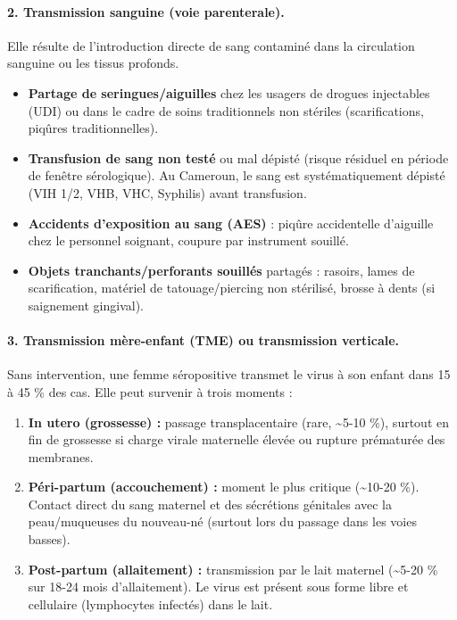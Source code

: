 \documentclass[11pt]{article}
\begin{document}
\paragraph{2. Transmission sanguine (voie parenterale).}
Elle résulte de l'introduction directe de sang contaminé dans la circulation sanguine ou les tissus profonds.
\begin{itemize}
    \item \textbf{Partage de seringues/aiguilles} chez les usagers de drogues injectables (UDI) ou dans le cadre de soins traditionnels non stériles (scarifications, piqûres traditionnelles).
    \item \textbf{Transfusion de sang non testé} ou mal dépisté (risque résiduel en période de fenêtre sérologique). Au Cameroun, le sang est systématiquement dépisté (VIH 1/2, VHB, VHC, Syphilis) avant transfusion.
    \item \textbf{Accidents d'exposition au sang (AES)} : piqûre accidentelle d'aiguille chez le personnel soignant, coupure par instrument souillé.
    \item \textbf{Objets tranchants/perforants souillés} partagés : rasoirs, lames de scarification, matériel de tatouage/piercing non stérilisé, brosse à dents (si saignement gingival).
\end{itemize}

\paragraph{3. Transmission mère-enfant (TME) ou transmission verticale.}
Sans intervention, une femme séropositive transmet le virus à son enfant dans 15 à 45 \% des cas. Elle peut survenir à trois moments :
\begin{enumerate}
    \item \textbf{In utero (grossesse) :} passage transplacentaire (rare, \textasciitilde 5-10 \%), surtout en fin de grossesse si charge virale maternelle élevée ou rupture prématurée des membranes.
    \item \textbf{Péri-partum (accouchement) :} moment le plus critique (\textasciitilde 10-20 \%). Contact direct du sang maternel et des sécrétions génitales avec la peau/muqueuses du nouveau-né (surtout lors du passage dans les voies basses).
    \item \textbf{Post-partum (allaitement) :} transmission par le lait maternel (\textasciitilde 5-20 \% sur 18-24 mois d'allaitement). Le virus est présent sous forme libre et cellulaire (lymphocytes infectés) dans le lait.
\end{enumerate}
\end{document}
